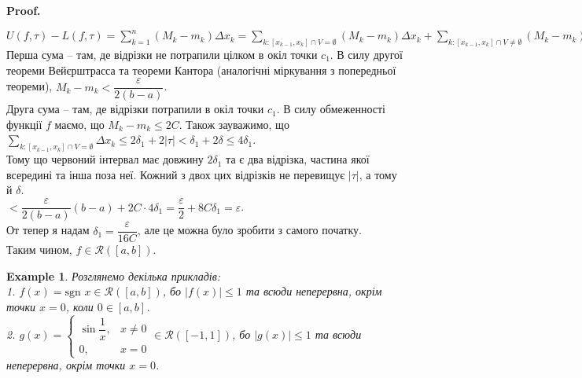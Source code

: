 \documentclass[a4paper, 10pt]{article}
\makeatletter
\def\huge{\displaystyle}
\def\qed{$\blacksquare$}
\theoremstyle{theoremdd}
\theoremstyle{theoremdd}
\theoremstyle{theoremdd}
\theoremstyle{theoremdd}
\theoremstyle{theoremdd}
\newtheorem{example}[theorem]{Example}
\theoremstyle{theoremdd}
\theoremstyle{theoremdd}
\theoremstyle{theoremdd}
\theoremstyle{theoremdd}
\renewenvironment{proof}[1][Proof.\\]{\par
\pushQED{\hfill \qed}%
\normalfont \topsep6\p@\@plus6\p@\relax
\trivlist
\item\relax
{\bfseries
#1\@addpunct{.}}\hspace\labelsep\ignorespaces
}{%
\popQED\endtrivlist\@endpefalse
}
\makeatother
\begin{document}
\begin{proof}
\begin{figure}[H]
\end{figure}
$U(f,\tau) - L(f,\tau) = \huge\sum_{k=1}^n (M_k-m_k) \Delta x_k = \huge\sum_{k:[x_{k-1},x_k] \cap V = \emptyset} (M_k - m_k) \Delta x_k + \sum_{k: [x_{k-1},x_{k}] \cap V \neq \emptyset} (M_k - m_k) \Delta x_k \boxed{<}$\\
Перша сума -- там, де відрізки не потрапили цілком в окіл точки $c_1$. В силу другої теореми Вейєрштрасса та теореми Кантора (аналогічні міркування з попередньої теореми), $M_k - m_k < \dfrac{\varepsilon}{2(b-a)}$.\\
Друга сума -- там, де відрізки потрапили в окіл точки $c_1$. В силу обмеженності функції $f$ маємо, що $M_k-m_k \leq 2C$. Також зауважимо, що $\huge\sum_{k:[x_{k-1},x_k] \cap V = \emptyset} \Delta x_k \leq 2 \delta_1 + 2 |\tau| <  \delta_1 + 2 \delta \leq 4\delta_1$.\\
Тому що червоний інтервал має довжину $2\delta_1$ та є два відрізка, частина якої всередині та інша поза неї. Кожний з двох цих відрізків не перевищує $|\tau|$, а тому й $\delta$.\\
$\boxed{<} \dfrac{\varepsilon}{2(b-a)} (b-a) + 2 C \cdot 4 \delta_1 = \dfrac{\varepsilon}{2} + 8C\delta_1 = \varepsilon$.\\
От тепер я надам $\delta_1 = \dfrac{\varepsilon}{16C}$, але це можна було зробити з самого початку.\\
Таким чином, $f \in \mathcal{R}([a,b])$.
\iffalse
\bigskip \\
Ось далі крок МІ: ми припускаємо, що коли $f \in C([a,b]) \setminus \{c_1,c_2,\dots,c_n\})$, то тоді $f \in \mathcal{R}([a,b])$. Доведемо, що коли уже $f \in C([a,b]) \setminus \{c_1,c_2,\dots,c_n,c_{n+1}\})$, то тоді $f \in \mathcal{R}([a,b])$.\\
Не втрачаючи загальності, розглянемо деяку точку $x^* \in (c_n,c_{n+1})$, а далі будемо дивитись на функцію $f$ на $[a,x^*]$ та $[x^*,b]$.\\
На першому відрізку рівно $n$ точок розриву. За припущенням МІ, $f \in \mathcal{R}([a,x^*])$.\\
На другому відрізку рівно $1$ точка розриву. Уже доводили для неї, що $f \in \mathcal{R}([x^*,b])$.\\
А тоді за адитивністю, маємо $f \in \mathcal{R}([a,b])$. МІ доведено.
\fi
\end{proof}

\begin{example}
Розглянемо декілька прикладів:\\
1. $f(x) = \text{sgn }x \in \mathcal{R}([a,b])$, бо $|f(x)| \leq 1$ та всюди неперервна, окрім точки $x = 0$, коли $0 \in [a,b]$.\\
2. $g(x) = \begin{cases} \sin \dfrac{1}{x}, & x \neq 0 \\ 0, & x = 0 \end{cases} \in \mathcal{R}([-1,1])$, бо $|g(x)| \leq 1$ та всюди неперервна, окрім точки $x = 0$.
\end{example}
\end{document}
